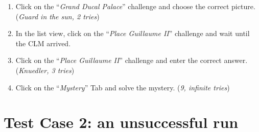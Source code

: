 \begin{enumerate}
	\item Click on the ``\emph{Grand Ducal Palace}'' challenge and choose the correct picture. (\emph{Guard in the sun, 2 tries})
	\item In the list view, click on the ``\emph{Place Guillaume II}'' challenge and wait until the CLM arrived.
	\item Click on the ``\emph{Place Guillaume II}'' challenge and enter the correct answer. (\emph{Knuedler, 3 tries})
	\item Click on the ``\emph{Mystery}'' Tab and solve the mystery. (\emph{9, infinite tries})
\end{enumerate}

\section{Test Case 2: an unsuccessful run}
